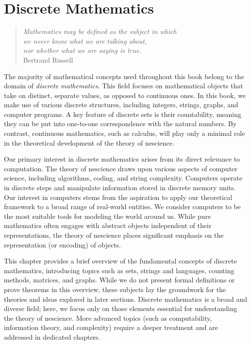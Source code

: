 %
%


\chapter{Discrete Mathematics}
\label{chap:Discrete_Mathematics}

\begin{quote}
\begin{flushright}
\emph{Mathematics may be defined as the subject in which\\
we never know what we are talking about,\\
nor whether what we are saying is true.}\\
Bertrand Russell
\end{flushright}
\end{quote}
\bigskip

The majority of mathematical concepts used throughout this book belong to the domain of \emph{discrete mathematics}. This field focuses on mathematical objects that take on distinct, separate values, as opposed to continuous ones. In this book, we make use of various discrete structures, including integers, strings, graphs, and computer programs. A key feature of discrete sets is their countability, meaning they can be put into one-to-one correspondence with the natural numbers. By contrast, continuous mathematics, such as calculus, will play only a minimal role in the theoretical development of the theory of nescience.

Our primary interest in discrete mathematics arises from its direct relevance to computation. The theory of nescience draws upon various aspects of computer science, including algorithms, coding, and string complexity. Computers operate in discrete steps and manipulate information stored in discrete memory units. Our interest in computers stems from the aspiration to apply our theoretical framework to a broad range of real-world entities. We consider computers to be the most suitable tools for modeling the world around us. While pure mathematics often engages with abstract objects independent of their representations, the theory of nescience places significant emphasis on the representation (or encoding) of objects.

This chapter provides a brief overview of the fundamental concepts of discrete mathematics, introducing topics such as sets, strings and languages, counting methods, matrices, and graphs. While we do not present formal definitions or prove theorems in this overview, these subjects lay the groundwork for the theories and ideas explored in later sections. Discrete mathematics is a broad and diverse field; here, we focus only on those elements essential for understanding the theory of nescience. More advanced topics (such as computability, information theory, and complexity) require a deeper treatment and are addressed in dedicated chapters.


